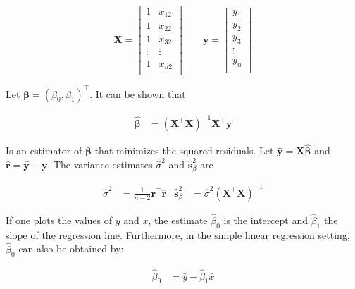\documentclass[11pt,a4paper,twoside]{book}\usepackage[]{graphicx}\usepackage[]{color}
\begin{document}
\begin{equation*}
\mathbf{X} = 
\begin{bmatrix}
1 & x_{12} \\
1 & x_{22} \\
1 & x_{32} \\
\vdots & \vdots \\
1 & x_{n2} \\
\end{bmatrix} 
\qquad
\mathbf{y} = 
\begin{bmatrix}
y_1 \\
y_2 \\
y_3 \\
\vdots \\
y_n \\
\end{bmatrix}
\end{equation*}

\vspace{2mm}

Let $\mathbf{\beta} = (\beta_0, \beta_1)^\top$. It can be shown that 

\begin{align}
\hat{\mathbf{\beta}} &= (\mathbf{X}^\top \mathbf{X})^{-1} \mathbf{X}^\top \mathbf{y} \label{eq:regression.parameters}
\end{align}

Is an estimator of $\mathbf{\beta}$ that minimizes the squared residuals. Let $\hat{\mathbf{y}} = \mathbf{X}\hat{\mathbf{\beta}}$ and $\hat{\mathbf{r}} = \hat{\mathbf{y}} - \mathbf{y}$. The variance estimates $\hat{\sigma}^2$ and $\hat{\mathbf{s}}_\beta^2$ are

\begin{align}
\hat{\sigma}^2 &= \frac{1}{n-2}\mathbf{r}^\top \hat{\mathbf{r}} & \hat{\mathbf{s}}_\beta^2 &= \hat{\sigma}^2 (\mathbf{X}^\top \mathbf{X})^{-1} \label{eq:regression.variances}
\end{align}

If one plots the values of $y$ and $x$, the estimate $\hat{\beta}_0$ is the intercept and $\hat{\beta}_1$ the slope of the regression line. Furthermore, in the simple linear regression setting, $\hat{\beta}_0$ can also be obtained by:

\begin{align}
\hat{\beta}_0 &= \bar{y} - \hat{\beta}_1 \bar{x} \nonumber
\end{align}
\end{document}
